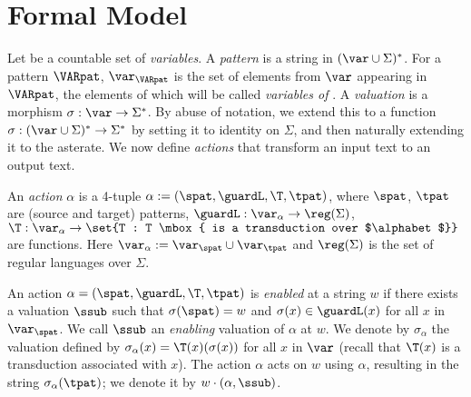
\section{Formal Model}\label{sec:formalModel-strings}

Let \var{} be a countable set of \emph{variables}. A \emph{pattern} is a string in $(\var \cup \Sigma)^*$. For a pattern $\VARpat$, $\var_\VARpat$ is the set of elements from $\var$ appearing in $\VARpat$, the elements of which will be called \emph{variables of \VARpat}. A \emph{valuation} is a morphism $\sigma : \var \to \Sigma^*$. By abuse of notation, we extend this to a function $\sigma : (\var \cup \Sigma)^* \to \Sigma^*$ by setting it to identity on $\Sigma$, and then naturally extending it to the asterate.  We now define \textit{actions} that transform an input text to an output text.

An \emph{action} $\alpha$ is a 4-tuple $ \alpha := (\spat, \guardL, \T, \tpat)$, where $\spat$, $\tpat$ are (source and target) patterns, $\guardL: \var_\alpha \to \reg(\Sigma)$, $\T :\var_\alpha \to \set{T : T \mbox{ is a transduction over $\alphabet$}}$ are functions. Here $\var_\alpha := \var_\spat \cup \var_\tpat$ and $\reg(\Sigma)$ is the set of regular languages over $\Sigma$.

An action $\alpha = (\spat, \guardL, \T, \tpat)$ is \emph{enabled} at a string $w$ if there exists a valuation $\ssub$ such that $\sigma(\spat) = w$ and $\sigma(x) \in \guardL(x)$ for all $x$ in  $\var_\spat$. We call $\ssub$ an \emph{enabling} valuation of $\alpha$ at $w$. We denote by $\sigma_\alpha$ the valuation defined by $\sigma_\alpha(x)=\T(x)(\sigma(x))$ for all $x$ in $\var$ (recall that $\T(x)$ is a transduction associated with $x$). The action $\alpha$ acts on $w$ using $\alpha$, resulting in the string $\sigma_\alpha(\tpat)$; we denote it by $w\cdot (\alpha, \ssub)$.

